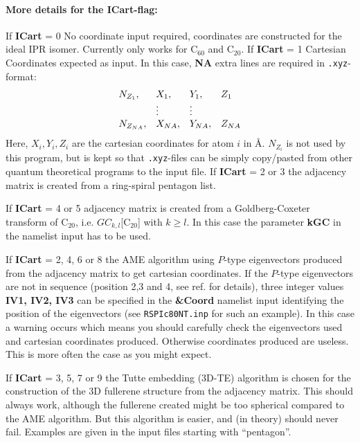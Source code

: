 \documentclass[article,a4paper,twoside]{memoir}
\newcommand{\C}[1]{\ensuremath{\mathrm{C}_{#1}}}
\newcommand{\filename}[1]{\texttt{#1}}
\newcommand{\paramname}[1]{{\color{green}\textbf{#1}}}
\begin{document}
\paragraph{More details for the \paramname{ICart}-flag:} 
If \paramname{ICart} = 0 No coordinate input required, coordinates are constructed for the ideal IPR isomer.
Currently only works for \C{60} and \C{20}.
If \paramname{ICart} = 1 Cartesian Coordinates expected as input. In this case, \paramname{NA} extra lines are required in \filename{.xyz}-format:
\[
\begin{array}{{llll}}
  N_{Z_1},& X_1,& Y_1,& Z_1\\
         &\vdots&\vdots& \\
  N_{{Z_{NA}}},& X_{NA},& Y_{NA},& Z_{NA}\\
\end{array}
\]
Here, $X_i, Y_i, Z_i$ are the cartesian
coordinates for atom $i$ in \AA. $N_{Z_i}$ is not used by
this program, but is kept so that \filename{.xyz}-files can be simply copy/pasted from other quantum theoretical programs to the input file.
If \paramname{ICart} = 2 or 3 the adjacency matrix is created from a ring-spiral pentagon list.

If \paramname{ICart} = 4 or 5 adjacency matrix is created from a Goldberg-Coxeter transform of \C{20}, i.e. $GC_{k,l}$[\C{20}] with $k \geq l$.  
In this case the parameter \paramname{kGC} in the namelist input has to be used.

If \paramname{ICart} = 2, 4, 6 or 8 the AME algorithm using $P$-type eigenvectors produced from the adjacency matrix to get cartesian
coordinates.  If the $P$-type eigenvectors are not in sequence (position 2,3 and 4, see ref.\cite{Atlas} for details), three integer
values \paramname{IV1, IV2, IV3} can be specified in the \paramname{\&Coord} namelist input identifying the position of the eigenvectors (see
\filename{RSPIc80NT.inp} for such an example).  In this case a warning occurs which means you should carefully check the eigenvectors used and
cartesian coordinates produced. Otherwise coordinates produced are useless. This is more often the case as you might expect.

If \paramname{ICart} = 3, 5, 7 or 9 the Tutte embedding (3D-TE) algorithm is chosen for the construction of the 3D fullerene structure from the
adjacency matrix.  This should always work, although the fullerene created might be too spherical compared to the AME algorithm. But this
algorithm is easier, and (in theory) should never fail. Examples are given in the input files starting with ``pentagon''.
\end{document}
